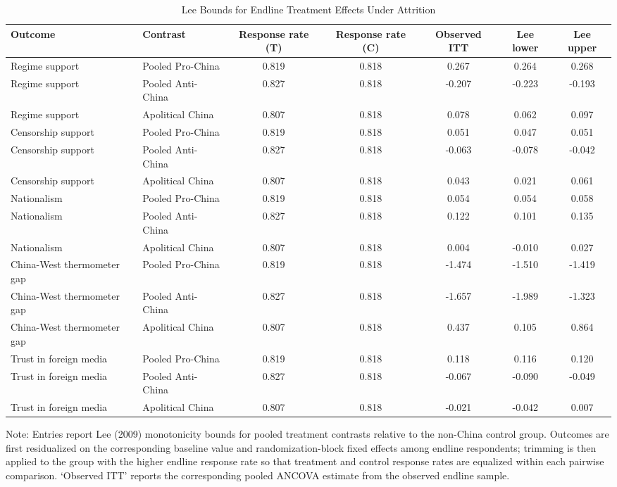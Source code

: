 \begin{table}[H]
\centering
\caption{Lee Bounds for Endline Treatment Effects Under Attrition}
\label{tab:lee_bounds_t1}
\footnotesize
\begin{threeparttable}
\begin{tabular}{llccccc}
\toprule
Outcome & Contrast & Response rate (T) & Response rate (C) & Observed ITT & Lee lower & Lee upper \\
\midrule
Regime support & Pooled Pro-China & 0.819 & 0.818 & 0.267 & 0.264 & 0.268 \\
Regime support & Pooled Anti-China & 0.827 & 0.818 & -0.207 & -0.223 & -0.193 \\
Regime support & Apolitical China & 0.807 & 0.818 & 0.078 & 0.062 & 0.097 \\
Censorship support & Pooled Pro-China & 0.819 & 0.818 & 0.051 & 0.047 & 0.051 \\
Censorship support & Pooled Anti-China & 0.827 & 0.818 & -0.063 & -0.078 & -0.042 \\
Censorship support & Apolitical China & 0.807 & 0.818 & 0.043 & 0.021 & 0.061 \\
Nationalism & Pooled Pro-China & 0.819 & 0.818 & 0.054 & 0.054 & 0.058 \\
Nationalism & Pooled Anti-China & 0.827 & 0.818 & 0.122 & 0.101 & 0.135 \\
Nationalism & Apolitical China & 0.807 & 0.818 & 0.004 & -0.010 & 0.027 \\
China-West thermometer gap & Pooled Pro-China & 0.819 & 0.818 & -1.474 & -1.510 & -1.419 \\
China-West thermometer gap & Pooled Anti-China & 0.827 & 0.818 & -1.657 & -1.989 & -1.323 \\
China-West thermometer gap & Apolitical China & 0.807 & 0.818 & 0.437 & 0.105 & 0.864 \\
Trust in foreign media & Pooled Pro-China & 0.819 & 0.818 & 0.118 & 0.116 & 0.120 \\
Trust in foreign media & Pooled Anti-China & 0.827 & 0.818 & -0.067 & -0.090 & -0.049 \\
Trust in foreign media & Apolitical China & 0.807 & 0.818 & -0.021 & -0.042 & 0.007 \\
\bottomrule
\end{tabular}
\begin{tablenotes}[flushleft]
\footnotesize
\item Note: Entries report Lee (2009) monotonicity bounds for pooled treatment contrasts relative to the non-China control group. Outcomes are first residualized on the corresponding baseline value and randomization-block fixed effects among endline respondents; trimming is then applied to the group with the higher endline response rate so that treatment and control response rates are equalized within each pairwise comparison. `Observed ITT' reports the corresponding pooled ANCOVA estimate from the observed endline sample.
\end{tablenotes}
\end{threeparttable}
\end{table}
